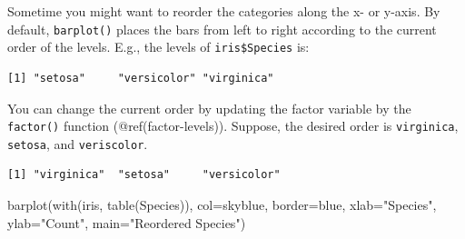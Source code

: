 \documentclass[
  letterpaper,
]{book}
\newenvironment{Shaded}{\begin{snugshade}}{\end{snugshade}}
\newcommand{\AttributeTok}[1]{\textcolor[rgb]{0.40,0.45,0.13}{#1}}
\newcommand{\ConstantTok}[1]{\textcolor[rgb]{0.56,0.35,0.01}{#1}}
\newcommand{\FunctionTok}[1]{\textcolor[rgb]{0.28,0.35,0.67}{#1}}
\newcommand{\NormalTok}[1]{\textcolor[rgb]{0.00,0.23,0.31}{#1}}
\newcommand{\OtherTok}[1]{\textcolor[rgb]{0.00,0.23,0.31}{#1}}
\newcommand{\SpecialCharTok}[1]{\textcolor[rgb]{0.37,0.37,0.37}{#1}}
\newcommand{\StringTok}[1]{\textcolor[rgb]{0.13,0.47,0.30}{#1}}
\begin{document}
Sometime you might want to reorder the categories along the x- or
y-axis. By default, \texttt{barplot()} places the bars from left to
right according to the current order of the levels. E.g., the levels of
\texttt{iris\$Species} is:

\begin{Shaded}
\end{Shaded}

\begin{verbatim}
[1] "setosa"     "versicolor" "virginica" 
\end{verbatim}

You can change the current order by updating the factor variable by the
\texttt{factor()} function (@ref(factor-levels)). Suppose, the desired
order is \texttt{virginica}, \texttt{setosa}, and \texttt{veriscolor}.

\begin{Shaded}
\end{Shaded}

\begin{verbatim}
[1] "virginica"  "setosa"     "versicolor"
\end{verbatim}

\begin{Shaded}
\begin{Highlighting}[]
\FunctionTok{barplot}\NormalTok{(}\FunctionTok{with}\NormalTok{(iris, }\FunctionTok{table}\NormalTok{(Species)), }
        \AttributeTok{col=}\StringTok{\textquotesingle{}skyblue\textquotesingle{}}\NormalTok{, }
        \AttributeTok{border=}\StringTok{\textquotesingle{}blue\textquotesingle{}}\NormalTok{, }
        \AttributeTok{xlab=}\StringTok{"Species"}\NormalTok{, }
        \AttributeTok{ylab=}\StringTok{"Count"}\NormalTok{, }
        \AttributeTok{main=}\StringTok{"Reordered Species"}\NormalTok{)}
\end{Highlighting}
\end{Shaded}
\end{document}
